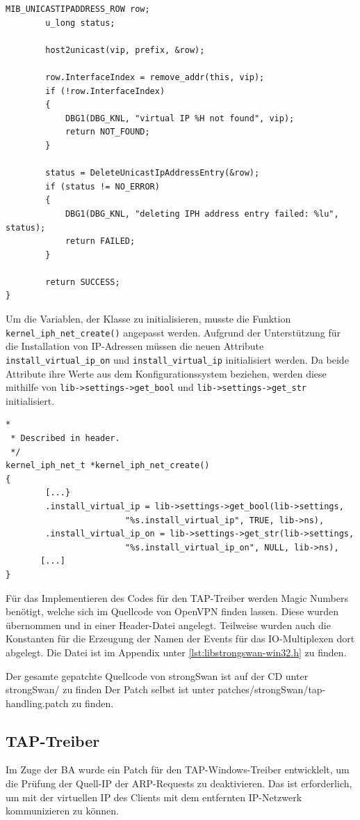 {\begin{lstlisting}[caption=Code für del\_ip,label=lst:kernel_iph_del_ip]
        MIB_UNICASTIPADDRESS_ROW row;
        u_long status;

        host2unicast(vip, prefix, &row);

        row.InterfaceIndex = remove_addr(this, vip);
        if (!row.InterfaceIndex)
        {
            DBG1(DBG_KNL, "virtual IP %H not found", vip);
            return NOT_FOUND;
        }

        status = DeleteUnicastIpAddressEntry(&row);
        if (status != NO_ERROR)
        {
            DBG1(DBG_KNL, "deleting IPH address entry failed: %lu", status);
            return FAILED;
        }

        return SUCCESS;
}
\end{lstlisting}

Um die Variablen, der Klasse zu initialisieren, musste die Funktion \texttt{kernel\_iph\_net\_create()}
angepasst werden. Aufgrund der Unterstützung für die Installation von \ac{IP}-Adressen
müssen die neuen Attribute \texttt{install\_virtual\_ip\_on} und \texttt{install\_virtual\_ip}
initialisiert werden. Da beide Attribute ihre Werte aus dem Konfigurationssystem
beziehen, werden diese mithilfe von \texttt{lib->settings->get\_bool} und \texttt{lib->settings->get\_str} initialisiert.

\begin{lstlisting}[caption=Ergänzung zu kernel\_iph\_net\_create(),label=lst:kernel_iph_create]
*
 * Described in header.
 */
kernel_iph_net_t *kernel_iph_net_create()
{
        [...}
        .install_virtual_ip = lib->settings->get_bool(lib->settings,
                        "%s.install_virtual_ip", TRUE, lib->ns),
        .install_virtual_ip_on = lib->settings->get_str(lib->settings,
                        "%s.install_virtual_ip_on", NULL, lib->ns),
       [...]
}
\end{lstlisting}

Für das Implementieren des Codes für den TAP-Treiber werden Magic Numbers benötigt,
welche sich im Quellcode von OpenVPN finden lassen. Diese wurden übernommen
und in einer Header-Datei angelegt.
Teilweise wurden auch die Konstanten für die Erzeugung der Namen der Events für
das IO-Multiplexen dort abgelegt. Die Datei ist im Appendix unter \autoref{lst:libstrongswan-win32.h}
zu finden.

Der gesamte gepatchte Quellcode von strongSwan ist auf der CD unter strongSwan/ zu finden
Der Patch selbst ist unter patches/strongSwan/tap-handling.patch zu finden.

\subsection{TAP-Treiber}
Im Zuge der \ac{BA} wurde ein Patch für den TAP-Windows-Treiber entwicklelt, um die
Prüfung der Quell-IP der ARP-Requests zu deaktivieren. Das ist erforderlich, um mit der
virtuellen IP des Clients mit dem entfernten IP-Netzwerk kommunizieren zu können.


}
